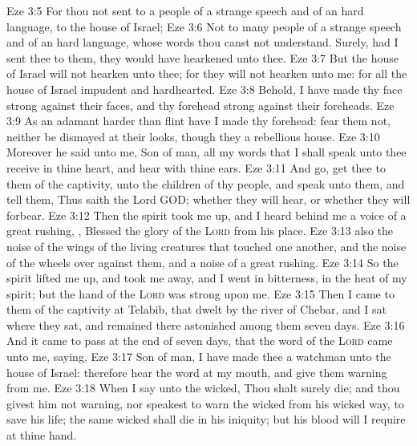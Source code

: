 \vs Eze 3:5 For thou  not sent to a people of a strange speech and of an hard language,  to the house of Israel;
\vs Eze 3:6 Not to many people of a strange speech and of an hard language, whose words thou canst not understand. Surely, had I sent thee to them, they would have hearkened unto thee.
\vs Eze 3:7 But the house of Israel will not hearken unto thee; for they will not hearken unto me: for all the house of Israel  impudent and hardhearted.
\vs Eze 3:8 Behold, I have made thy face strong against their faces, and thy forehead strong against their foreheads.
\vs Eze 3:9 As an adamant harder than flint have I made thy forehead: fear them not, neither be dismayed at their looks, though they  a rebellious house.
\vs Eze 3:10 Moreover he said unto me, Son of man, all my words that I shall speak unto thee receive in thine heart, and hear with thine ears.
\vs Eze 3:11 And go, get thee to them of the captivity, unto the children of thy people, and speak unto them, and tell them, Thus saith the Lord GOD; whether they will hear, or whether they will forbear.
\vs Eze 3:12 Then the spirit took me up, and I heard behind me a voice of a great rushing, , Blessed  the glory of the \textsc{Lord} from his place.
\vs Eze 3:13  also the noise of the wings of the living creatures that touched one another, and the noise of the wheels over against them, and a noise of a great rushing.
\vs Eze 3:14 So the spirit lifted me up, and took me away, and I went in bitterness, in the heat of my spirit; but the hand of the \textsc{Lord} was strong upon me.
\vs Eze 3:15 Then I came to them of the captivity at Telabib, that dwelt by the river of Chebar, and I sat where they sat, and remained there astonished among them seven days.
\vs Eze 3:16 And it came to pass at the end of seven days, that the word of the \textsc{Lord} came unto me, saying,
\vs Eze 3:17 Son of man, I have made thee a watchman unto the house of Israel: therefore hear the word at my mouth, and give them warning from me.
\vs Eze 3:18 When I say unto the wicked, Thou shalt surely die; and thou givest him not warning, nor speakest to warn the wicked from his wicked way, to save his life; the same wicked  shall die in his iniquity; but his blood will I require at thine hand.
